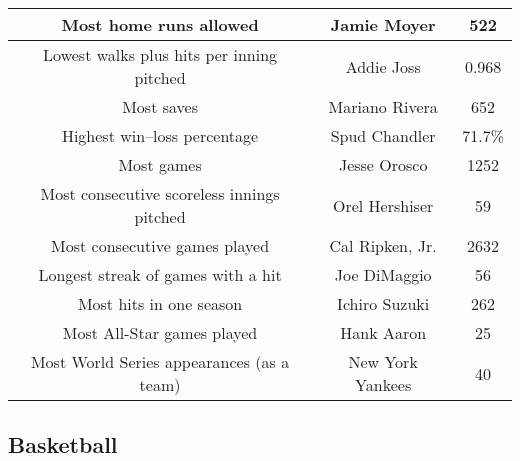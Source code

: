 \documentclass[12pt]{book}
\begin{document}
\begin{center}
\begin{tabular}{|c|c|c|}
					\hline
					Most home runs allowed 	&	Jamie Moyer 	&	522	\\
					\hline
					Lowest walks plus hits per inning pitched 	&	Addie Joss 	&	0.968	\\
					\hline
					Most saves 	&	Mariano Rivera 	&	652	\\
					\hline
					Highest win–loss percentage 	&	Spud Chandler 	&	71.7\% 	\\
					\hline
					Most games 	&	Jesse Orosco 	&	1252	\\
					\hline
					Most consecutive scoreless innings pitched 	&	Orel Hershiser 	&	59\\
					\hline
					Most consecutive games played & Cal Ripken, Jr. & 2632 \\
					\hline
					Longest streak of games with a hit& Joe DiMaggio & 56 \\
					\hline
					Most hits in one season & Ichiro Suzuki& 262 \\
					\hline
					Most All-Star games played & Hank Aaron & 25 \\
					\hline
					Most World Series appearances (as a team)& New York Yankees &  40 \\
					\hline

				
					
				\end{tabular}
				\vspace{1 in}
			\end{center}			

			
			\newpage
		\subsection{Basketball}
\end{document}

